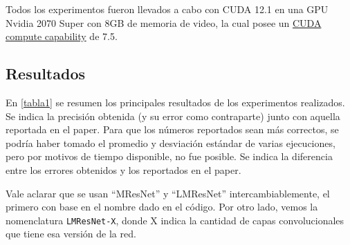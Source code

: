 \documentclass[titlepage,a4paper,oneside]{article}
\begin{document}
Todos los experimentos fueron llevados a cabo con CUDA 12.1 en una GPU Nvidia 2070 Super con 8GB de memoria de video, la cual posee un \href{https://developer.nvidia.com/cuda-gpus}{CUDA compute capability} de 7.5.

\subsection{Resultados}

En \ref{tabla1} se resumen los principales resultados de los experimentos realizados. Se indica la precisión obtenida (y su error como contraparte) junto con aquella reportada en el paper. Para que los números reportados sean más correctos, se podría haber tomado el promedio y desviación estándar de varias ejecuciones, pero por motivos de tiempo disponible, no fue posible. Se indica la diferencia entre los errores obtenidos y los reportados en el paper.

Vale aclarar que se usan ``MResNet'' y ``LMResNet'' intercambiablemente, el primero con base en el nombre dado en el código. Por otro lado, vemos la nomenclatura \texttt{LMResNet-X}, donde X indica la cantidad de capas convolucionales que tiene esa versión de la red.
\end{document}
